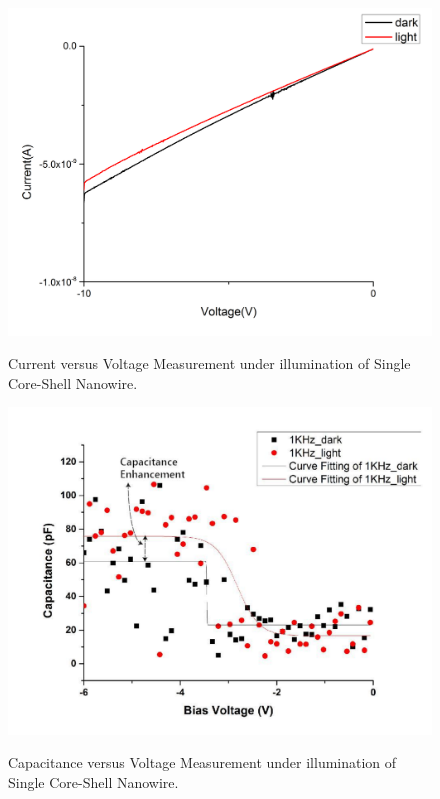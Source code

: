 \begin{figure}
  \caption{Current versus Voltage Measurement under illumination of Single Core-Shell Nanowire.}
  \centering
  \includegraphics[width=\textwidth]{pictures/Data/CSNWIVlight}
  \label{CSNWIVlight}
\end{figure}

\begin{figure}
  \caption{Capacitance versus Voltage Measurement under illumination of Single Core-Shell Nanowire.}
  \centering
  \includegraphics[width=\textwidth]{pictures/Data/CSNWCVlight}
  \label{CSNWCVlight}
\end{figure}


